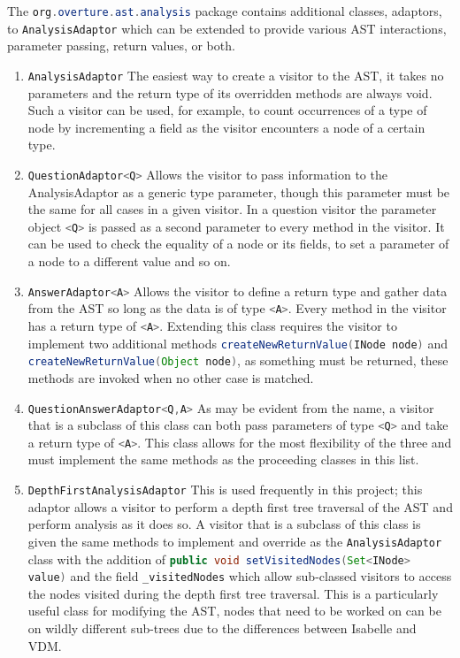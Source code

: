 	The \lstinline[language=Java]{org.overture.ast.analysis} package contains additional classes, adaptors, to \lstinline[language=Java]{AnalysisAdaptor} which can be extended to provide various AST interactions, parameter passing, return values, or both. 
	\begin{enumerate}
		\item \lstinline[language=Java]{AnalysisAdaptor} The easiest way to create a visitor to the AST, it takes no parameters and the return type of its overridden methods are always void. Such a visitor can be used, for example, to count occurrences of a type of node by incrementing a field as the visitor encounters a node of a certain type. 
		\item \lstinline[language=Java]{QuestionAdaptor<Q>} Allows the visitor to pass information to the AnalysisAdaptor as a generic type parameter, though this parameter must be the same for all cases in a given visitor. In a question visitor the parameter object \lstinline[language=Java]{<Q>} is passed as a second parameter to every method in the visitor. It can be used to check the equality of a node or its fields, to set a parameter of a node to a different value and so on.
		\item \lstinline[language=Java]{AnswerAdaptor<A>} Allows the visitor to define a return type and gather data from the AST so long as the data is of type \lstinline[language=Java]{<A>}. Every method in the visitor has a return type of \lstinline[language=Java]{<A>}. Extending this class requires the visitor to implement two additional methods \lstinline[language=Java]{createNewReturnValue(INode node)} and \lstinline[language=Java]{createNewReturnValue(Object node)}, as something must be returned, these methods are invoked when no other case is matched.
		\item \lstinline[language=Java]{QuestionAnswerAdaptor<Q,A>} As may be evident from the name, a visitor that is a subclass of this class can both pass parameters of type \lstinline[language=Java]{<Q>} and take a return type of \lstinline[language=Java]{<A>}. This class allows for the most flexibility of the three and must implement the same methods as the proceeding classes in this list.
		\item \lstinline[language=Java]{DepthFirstAnalysisAdaptor} This is used frequently in this project; this adaptor allows a visitor to perform a depth first tree traversal of the AST and perform analysis as it does so. A visitor that is a subclass of this class is given the same methods to implement and override as the \lstinline[language=Java]{AnalysisAdaptor} class with the addition of \lstinline[language=Java]{public void setVisitedNodes(Set<INode> value)} and the field \lstinline[language=Java]{_visitedNodes} which allow sub-classed visitors to access the nodes visited during the depth first tree traversal. This is a particularly useful class for modifying the AST, nodes that need to be worked on can be on wildly different sub-trees due to the differences between Isabelle and VDM.

\end{enumerate}
